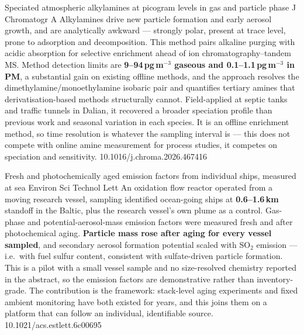 \documentclass[10pt]{article}
\begin{document}
{Speciated atmospheric alkylamines at picogram levels in gas and particle phase}
{J Chromatogr A}
{Alkylamines drive new particle formation and early aerosol growth, and are analytically
awkward --- strongly polar, present at trace level, prone to adsorption and decomposition.
This method pairs alkaline purging with acidic absorption for selective enrichment ahead of
ion chromatography--tandem MS. Method detection limits are \textbf{9--94\,pg\,m$^{-3}$
gaseous and 0.1--1.1\,pg\,m$^{-3}$ in PM}, a substantial gain on existing offline methods,
and the approach resolves the dimethylamine/monoethylamine isobaric pair and quantifies
tertiary amines that derivatisation-based methods structurally cannot. Field-applied at
septic tanks and traffic tunnels in Dalian, it recovered a broader speciation profile than
previous work and seasonal variation in each species. It is an offline enrichment method,
so time resolution is whatever the sampling interval is --- this does not compete with
online amine measurement for process studies, it competes on speciation and sensitivity.}
{10.1016/j.chroma.2026.467416}

{Fresh and photochemically aged emission factors from individual ships, measured at sea}
{Environ Sci Technol Lett}
{An oxidation flow reactor operated from a moving research vessel, sampling identified
ocean-going ships at \textbf{0.6--1.6\,km} standoff in the Baltic, plus the research
vessel's own plume as a control. Gas-phase and potential-aerosol-mass emission factors
were measured fresh and after photochemical aging. \textbf{Particle mass rose after aging
for every vessel sampled}, and secondary aerosol formation potential scaled with SO$_2$
emission --- i.e.\ with fuel sulfur content, consistent with sulfate-driven particle
formation. This is a pilot with a small vessel sample and no size-resolved chemistry
reported in the abstract, so the emission factors are demonstrative rather than
inventory-grade. The contribution is the framework: stack-level aging experiments and
fixed ambient monitoring have both existed for years, and this joins them on a platform
that can follow an individual, identifiable source.}
{10.1021/acs.estlett.6c00695}
\end{document}
